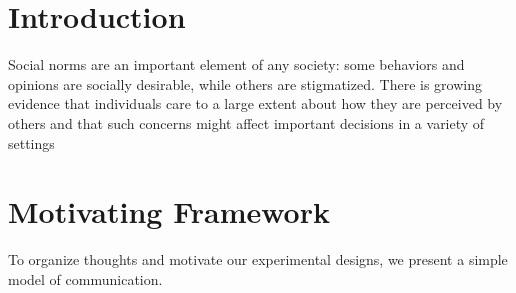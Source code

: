 \documentclass[11pt]{article}
\begin{document}
\renewcommand{\thefootnote}{\fnsymbol{footnote}}


\thispagestyle{empty}

\newpage 
\renewcommand{\thefootnote}{\arabic{footnote}}

\pagebreak 
\setcounter{page}{0}


\onehalfspacing


\newpage

\setcounter{page}{1}
\section{Introduction}

Social norms are an important element of any society: some behaviors and opinions are socially desirable, while others are stigmatized. There is growing evidence that individuals care to a large extent about how they are perceived by others and that such concerns might affect important decisions in a variety of settings





\section{Motivating Framework} \label{sectheory}

To organize thoughts and motivate our experimental designs, we present a simple model of communication.
\end{document}
